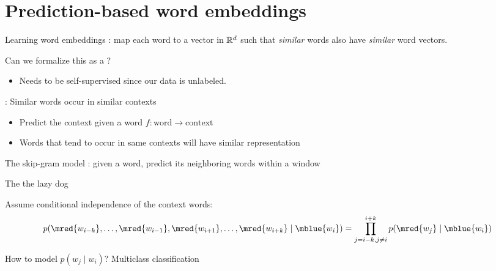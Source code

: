 \documentclass[usenames,dvipsnames,notes,11pt,aspectratio=169]{beamer}
\newcommand{\pdfnote}[1]{}
\begin{document}
\section{Prediction-based word embeddings}

\begin{frame}
    {Learning word embeddings}
    : map each word to a vector in $\mathbb{R}^d$ such that \textit{similar} words also have \textit{similar} word vectors.
    \vspace{1em}
    \pause

    Can we formalize this as a ?\\
    \begin{itemize}
        \item Needs to be self-supervised since our data is unlabeled.
    \end{itemize}
    \pause

    : Similar words occur in similar contexts\\
    \begin{itemize}
        \item Predict the context given a word $f\colon \text{word} \rightarrow \text{context}$
        \item Words that tend to occur in same contexts will have similar representation
    \end{itemize}
    \pdfnote{
        If we can successfully predict the context given a word, that means that words that occur in similar contexts have similar representations.
    }
\end{frame}

\begin{frame}
    {The skip-gram model}
    : given a word, predict its neighboring words within a window
    \begin{center}
        The      the lazy dog
    \end{center}

    \pause
    Assume conditional independence of the context words:
    $$
    p(\mred{w_{i-k}}, \ldots, \mred{w_{i-1}}, \mred{w_{i+1}}, \ldots, \mred{w_{i+k}} \mid \mblue{w_i}) =
    \prod_{j=i-k,j\neq i}^{i+k}p(\mred{w_j}\mid \mblue{w_i})
    $$

    \pause
    How to model $p(w_j\mid w_i)$? \pause \hspace{2em} Multiclass classification
\end{frame}
\end{document}
